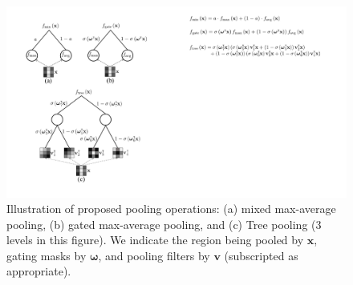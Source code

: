 \documentclass[twoside]{article}
\begin{document}
\begin{figure}[t]
  \centering
  \includegraphics[width=0.9\linewidth]{fig/illustration_new}
\vspace{-2mm}
\caption{Illustration of proposed pooling operations: (a) mixed max-average pooling, (b) gated max-average pooling, and (c) Tree pooling (3 levels in this figure).  We indicate the region being pooled by $\mathbf{x}$, gating masks by $\boldsymbol{\omega}$, and pooling filters by $\mathbf{v}$ (subscripted as appropriate). }
\label{fig:pool}
\vspace{-3.4mm}
\end{figure}
\end{document}
